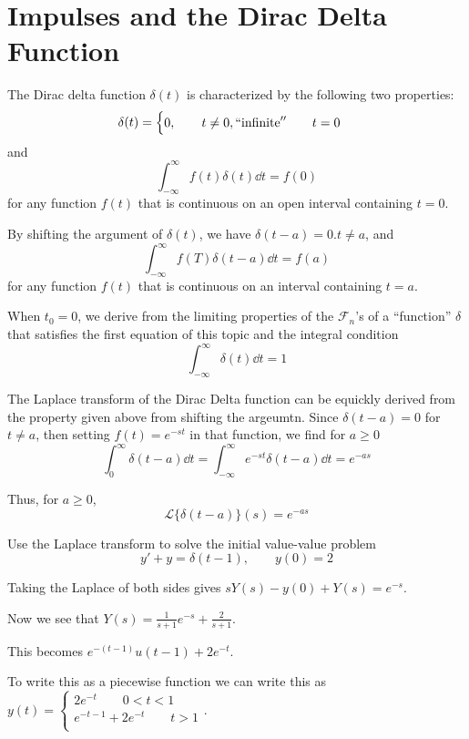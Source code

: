 \documentclass[../diffeq.tex]{subfiles}
\begin{document}
\section{Impulses and the Dirac Delta Function}
\begin{definition}
    The Dirac delta function $\delta(t)$ is characterized by the following two properties:
    \[ \delta(t)=\begin{cases}
        0, \qquad t\neq 0,
        ``\text{infinite}'' \qquad t=0 
    \end{cases}\]
and 
\[ \int_{-\infty}^{\infty}f(t)\delta (t)\dd t = f(0)\]
for any function $f(t)$ that is continuous on an open interval containing $t=0$.
\end{definition}

By shifting the argument of $\delta(t)$, we have $\delta(t-a)=0. t\neq a$, and 
\[ \int_{-\infty}^{\infty}f(T)\delta(t-a)\dd t = f(a) \]
for any function $f(t)$ that is continuous on an interval containing $t=a$.

When $t_0=0$, we derive from the limiting properties of the $\mathcal{F}_n$'s of a ``function'' $\delta$ that satisfies the first equation of this topic and the integral condition 
\[ \int_{-\infty}^{\infty}\delta(t)\dd t = 1 \]

The Laplace transform of the Dirac Delta function can be equickly derived from the property given above from shifting the argeumtn. Since $\delta(t-a)=0$ for $t\neq a$, then setting $f(t)=e^{-st}$ in that function, we find for $a\geq 0$
\[ \int_0^{\infty}\delta(t-a)\dd t = \int_{-\infty}^{\infty}e^{-st}\delta(t-a)\dd t = e^{-as} \]

Thus, for $a\geq 0$,
\[ \mathcal{L}\{\delta(t-a)\}(s)=e^{-as} \]

\begin{example}
    Use the Laplace transform to solve the initial value-value problem 
    \[ y'+y=\delta(t-1), \qquad y(0)=2 \]

    Taking the Laplace of both sides gives $sY(s)-y(0)+Y(s)= e^{-s}$.

    Now we see that $Y(s)=\frac{1}{s+1}e^{-s}+\frac{2}{s+1}$.

    This becomes $e^{-(t-1)}u(t-1)+2e^{-t}$.

    To write this as a piecewise function we can write this as $y(t)=\begin{cases}
        2e^{-t} \qquad 0<t<1 \\
        e^{-t-1}+2e^{-t} \qquad t>1 \\
    \end{cases}$.
\end{example}
\end{document}
